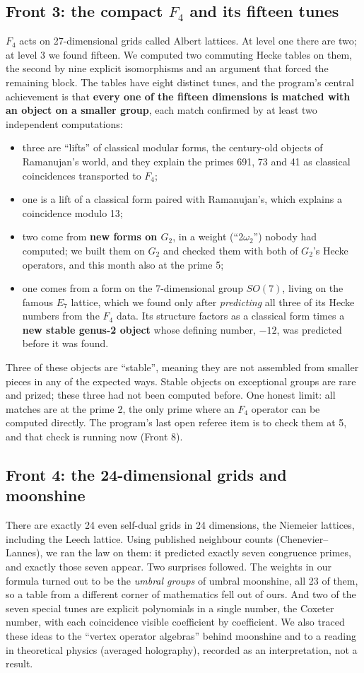 \documentclass[11pt]{article}
\begin{document}
\subsection{Front 3: the compact $F_4$ and its fifteen tunes}
$F_4$ acts on 27-dimensional grids called Albert lattices. At level one there are two; at level 3 we found fifteen. We computed two commuting Hecke tables on them, the second by nine explicit isomorphisms and an argument that forced the remaining block. The tables have eight distinct tunes, and the program's central achievement is that \textbf{every one of the fifteen dimensions is matched with an object on a smaller group}, each match confirmed by at least two independent computations:
\begin{itemize}[nosep]
\item three are ``lifts'' of classical modular forms, the century-old objects of Ramanujan's world, and they explain the primes 691, 73 and 41 as classical coincidences transported to $F_4$;
\item one is a lift of a classical form paired with Ramanujan's, which explains a coincidence modulo 13;
\item two come from \textbf{new forms on $G_2$}, in a weight (``2$\omega_2$'') nobody had computed; we built them on $G_2$ and checked them with both of $G_2$'s Hecke operators, and this month also at the prime 5;
\item one comes from a form on the 7-dimensional group $SO(7)$, living on the famous $E_7$ lattice, which we found only after \emph{predicting} all three of its Hecke numbers from the $F_4$ data. Its structure factors as a classical form times a \textbf{new stable genus-2 object} whose defining number, $-12$, was predicted before it was found.
\end{itemize}
Three of these objects are ``stable'', meaning they are not assembled from smaller pieces in any of the expected ways. Stable objects on exceptional groups are rare and prized; these three had not been computed before. One honest limit: all matches are at the prime 2, the only prime where an $F_4$ operator can be computed directly. The program's last open referee item is to check them at 5, and that check is running now (Front 8).

\subsection{Front 4: the 24-dimensional grids and moonshine}
There are exactly 24 even self-dual grids in 24 dimensions, the Niemeier lattices, including the Leech lattice. Using published neighbour counts (Chenevier--Lannes), we ran the law on them: it predicted exactly seven congruence primes, and exactly those seven appear. Two surprises followed. The weights in our formula turned out to be the \emph{umbral groups} of umbral moonshine, all 23 of them, so a table from a different corner of mathematics fell out of ours. And two of the seven special tunes are explicit polynomials in a single number, the Coxeter number, with each coincidence visible coefficient by coefficient. We also traced these ideas to the ``vertex operator algebras'' behind moonshine and to a reading in theoretical physics (averaged holography), recorded as an interpretation, not a result.
\end{document}
